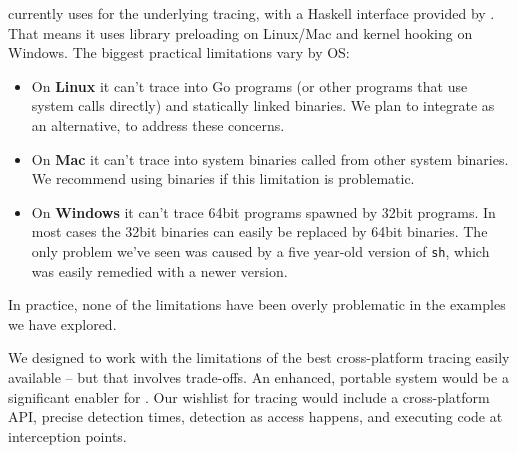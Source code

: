 \postparagraphs

\Rattle currently uses \Fsatrace for the underlying tracing, with a Haskell interface provided by \Shake. That means it uses library preloading on Linux/Mac and kernel hooking on Windows. The biggest practical limitations vary by OS:

\begin{itemize}
\item On \textbf{Linux} it can't trace into Go programs (or other programs that use system calls directly) and statically linked binaries. We plan to integrate \Bigbro as an alternative, to address these concerns.
\item On \textbf{Mac} it can't trace into system binaries called from other system binaries. We recommend using \Nix binaries if this limitation is problematic.
\item On \textbf{Windows} it can't trace 64bit programs spawned by 32bit programs. In most cases the 32bit binaries can easily be replaced by 64bit binaries. The only problem we've seen was caused by a five year-old version of \texttt{sh}, which was easily remedied with a newer version.
\end{itemize}

\noindent In practice, none of the limitations have been overly problematic in the examples we have explored.


We designed \Rattle to work with the limitations of the best cross-platform tracing easily available -- but that involves trade-offs. An enhanced, portable system would be a significant enabler for \Rattle.
Our wishlist for tracing would include a cross-platform API, precise detection times, detection as access happens, and executing code at interception points.

